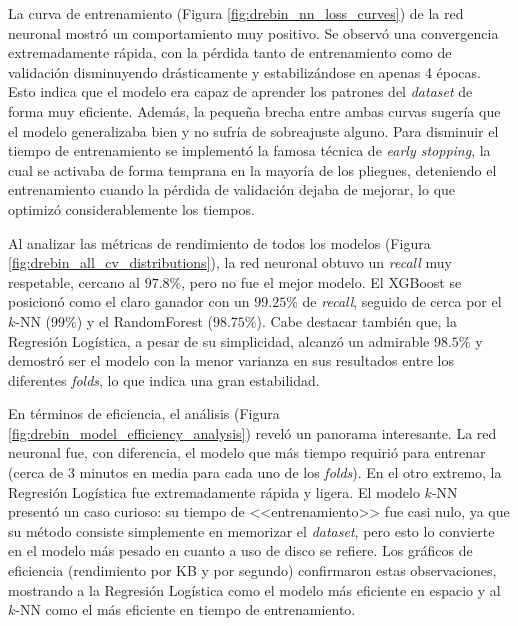 
La curva de entrenamiento (Figura \ref{fig:drebin_nn_loss_curves}) de la red neuronal mostró un comportamiento muy positivo. Se observó una convergencia extremadamente rápida, con la pérdida tanto de entrenamiento como de validación disminuyendo drásticamente y estabilizándose en apenas 4 épocas. Esto indica que el modelo era capaz de aprender los patrones del \textit{dataset} de forma muy eficiente. Además, la pequeña brecha entre ambas curvas sugería que el modelo generalizaba bien y no sufría de sobreajuste alguno. Para disminuir el tiempo de entrenamiento se implementó la famosa técnica de \textit{early stopping}, la cual se activaba de forma temprana en la mayoría de los pliegues, deteniendo el entrenamiento cuando la pérdida de validación dejaba de mejorar, lo que optimizó considerablemente los tiempos.


Al analizar las métricas de rendimiento de todos los modelos (Figura \ref{fig:drebin_all_cv_distributions}), la red neuronal obtuvo un \textit{recall} muy respetable, cercano al $97.8\%$, pero no fue el mejor modelo. El XGBoost se posicionó como el claro ganador con un $99.25\%$ de \textit{recall}, seguido de cerca por el $k$-NN (99\%) y el RandomForest ($98.75\%$). Cabe destacar también que, la Regresión Logística, a pesar de su simplicidad, alcanzó un admirable $98.5\%$ y demostró ser el modelo con la menor varianza en sus resultados entre los diferentes \textit{folds}, lo que indica una gran estabilidad.


En términos de eficiencia, el análisis (Figura \ref{fig:drebin_model_efficiency_analysis}) reveló un panorama interesante. La red neuronal fue, con diferencia, el modelo que más tiempo requirió para entrenar (cerca de 3 minutos en media para cada uno de los \textit{folds}). En el otro extremo, la Regresión Logística fue extremadamente rápida y ligera. El modelo $k$-NN presentó un caso curioso: su tiempo de <<entrenamiento>> fue casi nulo, ya que su método consiste simplemente en memorizar el \textit{dataset}, pero esto lo convierte en el modelo más pesado en cuanto a uso de disco se refiere. Los gráficos de eficiencia (rendimiento por KB y por segundo) confirmaron estas observaciones, mostrando a la Regresión Logística como el modelo más eficiente en espacio y al $k$-NN como el más eficiente en tiempo de entrenamiento.

